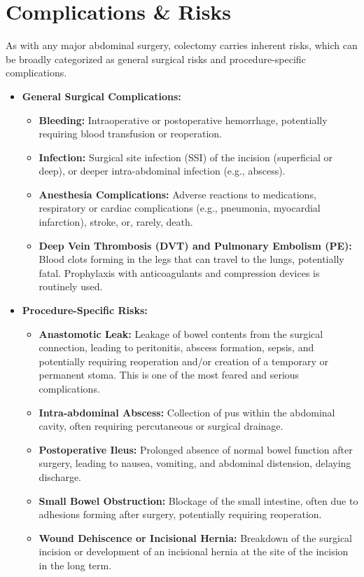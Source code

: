 \section*{Complications \& Risks}
As with any major abdominal surgery, colectomy carries inherent risks, which can be broadly categorized as general surgical risks and procedure-specific complications.
\begin{itemize}
  \item \textbf{General Surgical Complications:}
    \begin{itemize}
      \item \textbf{Bleeding:} Intraoperative or postoperative hemorrhage, potentially requiring blood transfusion or reoperation.
      \item \textbf{Infection:} Surgical site infection (SSI) of the incision (superficial or deep), or deeper intra-abdominal infection (e.g., abscess).
      \item \textbf{Anesthesia Complications:} Adverse reactions to medications, respiratory or cardiac complications (e.g., pneumonia, myocardial infarction), stroke, or, rarely, death.
      \item \textbf{Deep Vein Thrombosis (DVT) and Pulmonary Embolism (PE):} Blood clots forming in the legs that can travel to the lungs, potentially fatal. Prophylaxis with anticoagulants and compression devices is routinely used.
    \end{itemize}
  \item \textbf{Procedure-Specific Risks:}
    \begin{itemize}
      \item \textbf{Anastomotic Leak:} Leakage of bowel contents from the surgical connection, leading to peritonitis, abscess formation, sepsis, and potentially requiring reoperation and/or creation of a temporary or permanent stoma. This is one of the most feared and serious complications.
      \item \textbf{Intra-abdominal Abscess:} Collection of pus within the abdominal cavity, often requiring percutaneous or surgical drainage.
      \item \textbf{Postoperative Ileus:} Prolonged absence of normal bowel function after surgery, leading to nausea, vomiting, and abdominal distension, delaying discharge.
      \item \textbf{Small Bowel Obstruction:} Blockage of the small intestine, often due to adhesions forming after surgery, potentially requiring reoperation.
      \item \textbf{Wound Dehiscence or Incisional Hernia:} Breakdown of the surgical incision or development of an incisional hernia at the site of the incision in the long term.

\end{itemize}
\end{itemize}
